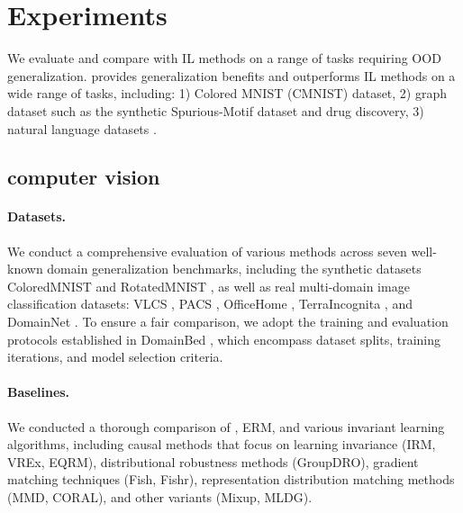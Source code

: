\section{Experiments}




We evaluate \ours and compare with IL methods on a range of tasks requiring OOD generalization. 
\ours provides generalization benefits and outperforms IL methods on a wide range of
tasks, including: 1) Colored MNIST (CMNIST) dataset, 2) graph dataset such as the synthetic Spurious-Motif dataset and drug discovery, 3) natural language datasets .

\subsection{computer vision}

\paragraph{Datasets.} We conduct a comprehensive evaluation of various methods across seven well-known domain generalization benchmarks, including the synthetic datasets ColoredMNIST \citep{irmv1} and RotatedMNIST \citep{rmnist}, as well as real multi-domain image classification datasets: VLCS \citep{vlcs}, PACS \citep{pacs}, OfficeHome \citep{officehome}, TerraIncognita \citep{TerraIncognita}, and DomainNet \citep{domainnet}. To ensure a fair comparison, we adopt the training and evaluation protocols established in DomainBed \citep{domainbed}, which encompass dataset splits, training iterations, and model selection criteria.

\paragraph{Baselines.} We conducted a thorough comparison of \ours, ERM, and various invariant learning algorithms, including causal methods that focus on learning invariance (IRM, VREx, EQRM), distributional robustness methods (GroupDRO), gradient matching techniques (Fish, Fishr), representation distribution matching methods (MMD, CORAL), and other variants (Mixup, MLDG).

